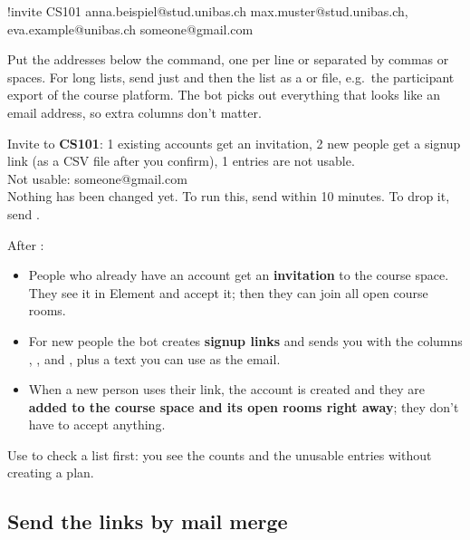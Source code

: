 \begin{you}
!invite CS101
anna.beispiel@stud.unibas.ch
max.muster@stud.unibas.ch, eva.example@unibas.ch
someone@gmail.com
\end{you}

Put the addresses below the command, one per line or separated by commas or spaces. For
long lists, send just  and then the list as a  or 
file, e.g.\ the participant export of the course platform. The bot picks out everything that
looks like an email address, so extra columns don't matter.

\begin{botreply}
Invite to \textbf{CS101}: 1 existing accounts get an invitation, 2 new people get a signup
link (as a CSV file after you confirm), 1 entries are not usable.\\
Not usable: someone@gmail.com\\[4pt]
Nothing has been changed yet. To run this, send  within 10 minutes. To
drop it, send .
\end{botreply}

After :

\begin{itemize}
  \item People who already have an account get an \textbf{invitation} to the course space.
        They see it in Element and accept it; then they can join all open course rooms.
  \item For new people the bot creates \textbf{signup links} and sends you
         with the columns , ,  and
        , plus a text you can use as the email.
  \item When a new person uses their link, the account is created and they are
        \textbf{added to the course space and its open rooms right away}; they don't have
        to accept anything.
\end{itemize}

\begin{tip}
Use  to check a list first: you see the counts and the unusable entries
without creating a plan.
\end{tip}

\subsection{Send the links by mail merge}
\label{sec:mailmerge}

